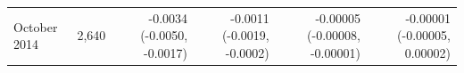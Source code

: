 \begin{tabular}{lrrrrr}
October 2014 & 2,640 & -0.0034 (-0.0050, -0.0017) & -0.0011 (-0.0019, -0.0002) & -0.00005 (-0.00008, -0.00001) & -0.00001 (-0.00005, 0.00002) \\

\end{tabular}
